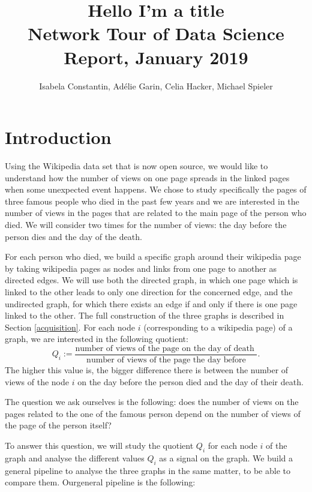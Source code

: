\documentclass[conference]{IEEEtran}
\begin{document}
\title{Hello I'm a title\\
{\footnotesize Network Tour of Data Science Report, January 2019}
}

\author{Isabela Constantin, Ad\'elie Garin, Celia Hacker, Michael Spieler}

\maketitle

\section{Introduction}
Using the Wikipedia data set that is now open source, we would like to understand how the number of views on one page spreads in the linked pages when some unexpected event happens. We chose to study specifically the pages of three famous people who died in the past few years and we are interested in the number of views in the pages that are related to the main page of the person who died. We will consider two times for the number of views: the day before the person dies and the day of the death. 

\medskip

For each person who died, we build a specific graph around their wikipedia page by taking wikipedia pages as nodes and links from one page to another as directed edges. We will use both the directed graph, in which one page which is linked to the other leads to only one direction for the concerned edge, and the undirected graph, for which there exists an edge if and only if there is one page linked to the other. The full construction of the three graphs is described in Section \ref{acquisition}. For each node $i$ (corresponding to a wikipedia page) of a graph, we are interested in the following quotient: \[Q_i:=\frac{\text{number of views of the page on the day of death }}{\text{number of views of the page the day before}}.\] The higher this value is, the bigger difference there is between the number of views of the node $i$ on the day before the person died and the day of their death. 

\medskip

The question we ask ourselves is the following: does the number of views on the pages related to the one of the famous person depend on the number of views of the page of the person itself? 

\medskip

To answer this question, we will study the quotient $Q_i$ for each node $i$ of the graph and analyse the different values $Q_i$  as a signal on the graph. We build a general pipeline to analyse the three graphs in the same matter, to be able to compare them. Ourgeneral pipeline is the following: 
\end{document}
